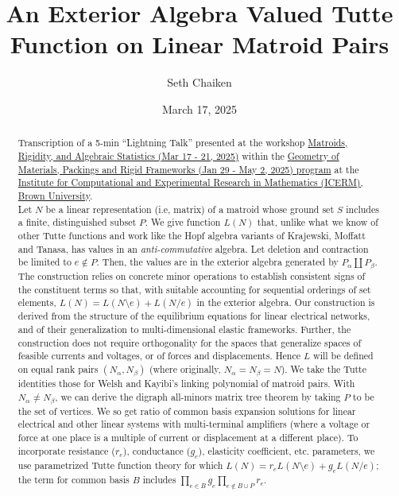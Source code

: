 \documentclass{article}
\title{An Exterior Algebra Valued Tutte Function on Linear Matroid Pairs}
\date{March 17, 2025}
\author{Seth Chaiken}
\begin{document}
\maketitle

\begin{abstract}

  Transcription of a 5-min ``Lightning Talk'' presented at
  the workshop
  \href{https://icerm.brown.edu/program/semester_program/sp-s25}{Matroids, Rigidity, and Algebraic Statistics (Mar 17 - 21, 2025)}
  within the
  \href{https://icerm.brown.edu/program/semester_program_workshop/sp-s25-w1}{Geometry of Materials, Packings and Rigid Frameworks
    (Jan 29 - May 2, 2025) program}
  at the \href{https://icerm.brown.edu/}{Institute for Computational and Experimental Research in Mathematics (ICERM), Brown University}.\\

  

  
Let $N$ be a linear representation (i.e, matrix) of a matroid whose
ground set $S$ includes a finite, distinguished subset $P$.  We give
function $L(N)$ that, unlike what we know of other Tutte functions and
work like the Hopf algebra variants of Krajewski, Moffatt and Tanasa,
has values in an \emph{anti-commutative} algebra. Let deletion and
contraction be limited to $e\not\in P$.  Then, the values are in the
exterior algebra generated by $P_\alpha \coprod P_\beta$.  The
construction relies on concrete minor operations to establish
consistent signs of the constituent terms so that, with suitable
accounting for sequential orderings of set elements,
$L(N)=L(N\setminus e)+L(N/e)$ in the exterior algebra. Our
construction is derived from the structure of the equilibrium
equations for linear electrical networks, and of their generalization
to multi-dimensional elastic frameworks.  Further, the construction
does not require orthogonality for the spaces that generalize spaces
of feasible currents and voltages, or of forces and displacements.
Hence $L$ will be defined on equal rank pairs $(N_\alpha, N_\beta)$
(where originally, $N_\alpha=N_\beta=N$).  We take the Tutte
identities those for Welsh and Kayibi's linking polynomial of matroid
pairs. With $N_\alpha\neq N_\beta$, we can derive the digraph
all-minors matrix tree theorem by taking $P$ to be the set of
vertices.  We so get ratio of common basis expansion solutions for
linear electrical and other linear systems with multi-terminal
amplifiers (where a voltage or force at one place is a multiple of
current or displacement at a different place).  To incorporate
resistance ($r_e$), conductance ($g_e$), elasticity coefficient,
etc. parameters, we use parametrized Tutte function theory for which
$L(N)=r_e L(N\setminus e)+ g_e L(N/e)$; the term for common basis $B$
includes $\prod _{e\in B} g_e \prod _{e\not\in B\cup P} r_e$.
\end{abstract}
\end{document}
